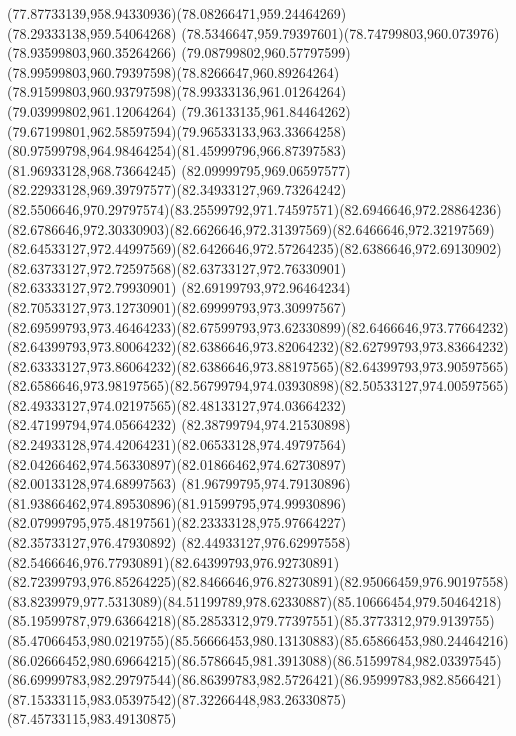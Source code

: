 {    \curveto(77.87733139,958.94330936)(78.08266471,959.24464269)(78.29333138,959.54064268)
    \curveto(78.5346647,959.79397601)(78.74799803,960.073976)(78.93599803,960.35264266)
    \curveto(79.08799802,960.57797599)(78.99599803,960.79397598)(78.8266647,960.89264264)
    \curveto(78.91599803,960.93797598)(78.99333136,961.01264264)(79.03999802,961.12064264)
    \curveto(79.36133135,961.84464262)(79.67199801,962.58597594)(79.96533133,963.33664258)
    \curveto(80.97599798,964.98464254)(81.45999796,966.87397583)(81.96933128,968.73664245)
    \curveto(82.09999795,969.06597577)(82.22933128,969.39797577)(82.34933127,969.73264242)
    \curveto(82.5506646,970.29797574)(83.25599792,971.74597571)(82.6946646,972.28864236)
    \curveto(82.6786646,972.30330903)(82.6626646,972.31397569)(82.6466646,972.32197569)
    \curveto(82.64533127,972.44997569)(82.6426646,972.57264235)(82.6386646,972.69130902)
    \curveto(82.63733127,972.72597568)(82.63733127,972.76330901)(82.63333127,972.79930901)
    \curveto(82.69199793,972.96464234)(82.70533127,973.12730901)(82.69999793,973.30997567)
    \curveto(82.69599793,973.46464233)(82.67599793,973.62330899)(82.6466646,973.77664232)
    \curveto(82.64399793,973.80064232)(82.6386646,973.82064232)(82.62799793,973.83664232)
    \curveto(82.63333127,973.86064232)(82.6386646,973.88197565)(82.64399793,973.90597565)
    \curveto(82.6586646,973.98197565)(82.56799794,974.03930898)(82.50533127,974.00597565)
    \curveto(82.49333127,974.02197565)(82.48133127,974.03664232)(82.47199794,974.05664232)
    \curveto(82.38799794,974.21530898)(82.24933128,974.42064231)(82.06533128,974.49797564)
    \curveto(82.04266462,974.56330897)(82.01866462,974.62730897)(82.00133128,974.68997563)
    \curveto(81.96799795,974.79130896)(81.93866462,974.89530896)(81.91599795,974.99930896)
    \curveto(82.07999795,975.48197561)(82.23333128,975.97664227)(82.35733127,976.47930892)
    \curveto(82.44933127,976.62997558)(82.5466646,976.77930891)(82.64399793,976.92730891)
    \curveto(82.72399793,976.85264225)(82.8466646,976.82730891)(82.95066459,976.90197558)
    \curveto(83.8239979,977.5313089)(84.51199789,978.62330887)(85.10666454,979.50464218)
    \curveto(85.19599787,979.63664218)(85.2853312,979.77397551)(85.3773312,979.9139755)
    \curveto(85.47066453,980.0219755)(85.56666453,980.13130883)(85.65866453,980.24464216)
    \curveto(86.02666452,980.69664215)(86.5786645,981.3913088)(86.51599784,982.03397545)
    \curveto(86.69999783,982.29797544)(86.86399783,982.5726421)(86.95999783,982.8566421)
    \curveto(87.15333115,983.05397542)(87.32266448,983.26330875)(87.45733115,983.49130875)
}
